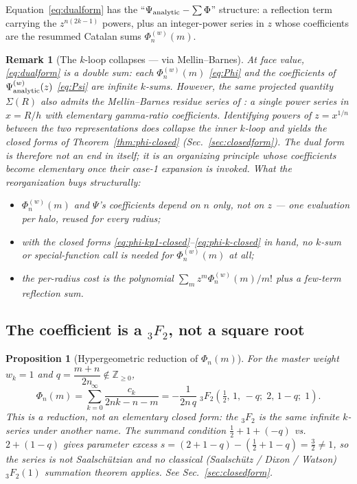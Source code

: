 \documentclass{article}
\newtheorem{proposition}{Proposition}
\newtheorem{remark}{Remark}
\begin{document}
Equation~\eqref{eq:dualform} has the ``$\Psi_{\rm analytic}-\sum\Phi$''
structure: a reflection term carrying the $z^{n(2k-1)}$ powers, plus an
integer-power series in $z$ whose coefficients are the resummed Catalan sums
$\Phi^{(w)}_n(m)$.

\begin{remark}[The $k$-loop collapses --- via Mellin--Barnes]\label{rem:double}
At face value, \eqref{eq:dualform} is a double sum: each $\Phi^{(w)}_n(m)$
\eqref{eq:Phi} and the coefficients of $\Psi^{(w)}_{\rm analytic}(z)$
\eqref{eq:Psi} are infinite $k$-sums.  However, the same projected quantity
$\Sigma(R)$ also admits the Mellin--Barnes residue series of
\citet{RetanaMontenegro2012}: a single power series in $x=R/h$ with elementary gamma-ratio
coefficients.  Identifying powers of $z=x^{1/n}$ between the two
representations \emph{does} collapse the inner $k$-loop and yields the closed
forms of Theorem~\ref{thm:phi-closed} (Sec.~\ref{sec:closedform}).  The dual
form is therefore not an end in itself; it is an organizing principle whose
coefficients become elementary once their case-1 expansion is invoked.
What the reorganization buys structurally:
\begin{itemize}
\item $\Phi^{(w)}_n(m)$ and $\Psi$'s coefficients depend on $n$ only, not on
$z$ --- one evaluation per halo, reused for every radius;
\item with the closed forms \eqref{eq:phi-kp1-closed}--\eqref{eq:phi-k-closed}
in hand, no $k$-sum or special-function call is needed for $\Phi^{(w)}_n(m)$
at all;
\item the per-radius cost is the polynomial $\sum_m z^m\Phi^{(w)}_n(m)/m!$
plus a few-term reflection sum.
\end{itemize}
\end{remark}

\subsection{The coefficient is a \texorpdfstring{${}_3F_2$}{3F2}, not a square root}

\begin{proposition}[Hypergeometric reduction of $\Phi_n(m)$]\label{prop:phi}
For the master weight $w_k=1$ and $q=\dfrac{m+n}{2n}\notin\mathbb{Z}_{\ge0}$,
\begin{equation}\label{eq:phi-3f2}
\Phi_n(m)=\sum_{k=0}^{\infty}\frac{c_k}{2nk-n-m}
        =-\frac{1}{2n\,q}\;
         {}_3F_2\!\left(\tfrac12,\,1,\,-q;\;2,\,1-q;\;1\right).
\end{equation}
This is a \emph{reduction}, not an elementary closed form: the ${}_3F_2$ is the
same infinite $k$-series under another name.  The summand condition
$\tfrac12+1+(-q)$ vs.\ $2+(1-q)$ gives parameter excess
$s=(2+1-q)-(\tfrac12+1-q)=\tfrac32\neq1$, so the series is \emph{not}
Saalsch\"utzian and no classical (Saalsch\"utz / Dixon / Watson)
${}_3F_2(1)$ summation theorem applies.  See Sec.~\ref{sec:closedform}.
\end{proposition}
\end{document}
